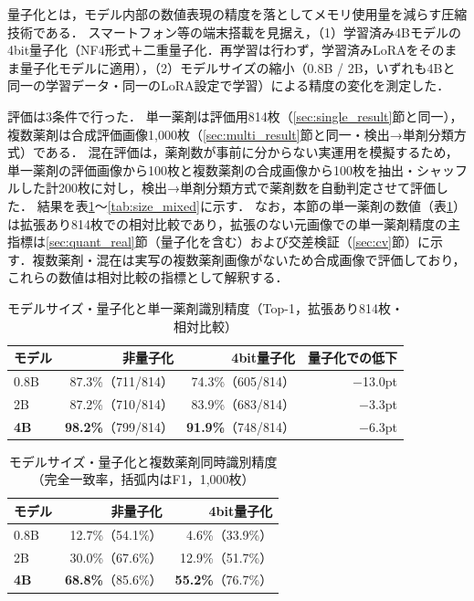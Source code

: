 \documentclass[dvipdfmx]{jsarticle}
\begin{document}
量子化とは，モデル内部の数値表現の精度を落としてメモリ使用量を減らす圧縮技術である．
スマートフォン等の端末搭載を見据え，（1）学習済み4Bモデルの4bit量子化（NF4形式＋二重量子化．再学習は行わず，学習済みLoRAをそのまま量子化モデルに適用），（2）モデルサイズの縮小（0.8B / 2B，いずれも4Bと同一の学習データ・同一のLoRA設定で学習）による精度の変化を測定した．

評価は3条件で行った．
単一薬剤は評価用814枚（\ref{sec:single_result}節と同一），複数薬剤は合成評価画像1,000枚（\ref{sec:multi_result}節と同一・検出→単剤分類方式）である．
混在評価は，薬剤数が事前に分からない実運用を模擬するため，単一薬剤の評価画像から100枚と複数薬剤の合成画像から100枚を抽出・シャッフルした計200枚に対し，検出→単剤分類方式で薬剤数を自動判定させて評価した．
結果を表\ref{tab:size_single}〜\ref{tab:size_mixed}に示す．
なお，本節の単一薬剤の数値（表\ref{tab:size_single}）は拡張あり814枚での相対比較であり，拡張のない元画像での単一薬剤精度の主指標は\ref{sec:quant_real}節（量子化を含む）および交差検証（\ref{sec:cv}節）に示す．複数薬剤・混在は実写の複数薬剤画像がないため合成画像で評価しており，これらの数値は相対比較の指標として解釈する．

\begin{table}[htbp]
\centering
\caption{モデルサイズ・量子化と単一薬剤識別精度（Top-1，拡張あり814枚・相対比較）}
\label{tab:size_single}
\begin{tabular}{lrrr}
\hline
モデル & 非量子化 & 4bit量子化 & 量子化での低下 \\
\hline
0.8B & 87.3\%（711/814） & 74.3\%（605/814） & $-$13.0pt \\
2B & 87.2\%（710/814） & 83.9\%（683/814） & $-$3.3pt \\
\textbf{4B} & \textbf{98.2\%}（799/814） & \textbf{91.9\%}（748/814） & $-$6.3pt \\
\hline
\end{tabular}
\end{table}

\begin{table}[htbp]
\centering
\caption{モデルサイズ・量子化と複数薬剤同時識別精度（完全一致率，括弧内はF1，1,000枚）}
\label{tab:size_multi}
\begin{tabular}{lrr}
\hline
モデル & 非量子化 & 4bit量子化 \\
\hline
0.8B & 12.7\%（54.1\%） & 4.6\%（33.9\%） \\
2B & 30.0\%（67.6\%） & 12.9\%（51.7\%） \\
\textbf{4B} & \textbf{68.8\%}（85.6\%） & \textbf{55.2\%}（76.7\%） \\
\hline
\end{tabular}
\end{table}
\end{document}
